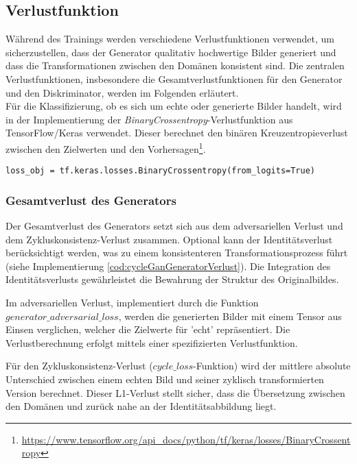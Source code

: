 \subsection{Verlustfunktion}
Während des Trainings werden verschiedene Verlustfunktionen verwendet, um sicherzustellen, dass der Generator qualitativ hochwertige Bilder generiert und dass die Transformationen zwischen den Domänen konsistent sind. Die zentralen Verlustfunktionen, insbesondere die Gesamtverlustfunktionen für den Generator und den Diskriminator, werden im Folgenden erläutert. 
\\
Für die Klassifizierung, ob es sich um echte oder generierte Bilder handelt, wird in der Implementierung der \textit{BinaryCrossentropy}-Verlustfunktion aus TensorFlow/Keras verwendet. 
Dieser berechnet den binären Kreuzentropieverlust zwischen den Zielwerten und den Vorhersagen\footnote{\url{https://www.tensorflow.org/api_docs/python/tf/keras/losses/BinaryCrossentropy}}.

\begin{lstlisting}[language=pyhaff, caption={Initialisierung des BinaryCrossentropy-Verlustfunktion}, label={cod:binaryCrossentropy}]
loss_obj = tf.keras.losses.BinaryCrossentropy(from_logits=True)
\end{lstlisting}


\subsubsection{Gesamtverlust des Generators}
Der Gesamtverlust des Generators setzt sich aus dem adversariellen Verlust und dem Zykluskonsistenz-Verlust zusammen. Optional kann der Identitätsverlust berücksichtigt werden, was zu einem konsistenteren Transformationsprozess führt (siehe Implementierung \ref{cod:cycleGanGeneratorVerlust}). Die Integration des Identitätsverlusts gewährleistet die Bewahrung der Struktur des Originalbildes.

Im adversariellen Verlust, implementiert durch die Funktion \\$generator\_adversarial\_loss$, werden die generierten Bilder mit einem Tensor aus Einsen verglichen, welcher die Zielwerte für 'echt' repräsentiert. Die Verlustberechnung erfolgt mittels einer spezifizierten Verlustfunktion.

Für den Zykluskonsistenz-Verlust ($cycle\_loss$-Funktion) wird der mittlere absolute Unterschied zwischen einem echten Bild und seiner zyklisch transformierten Version berechnet. Dieser L1-Verlust stellt sicher, dass die Übersetzung zwischen den Domänen und zurück nahe an der Identitätsabbildung liegt.

